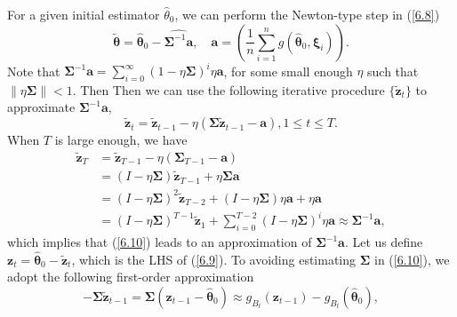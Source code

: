 \documentclass[12pt]{article}
\numberwithin{equation}{section}
\begin{document}
For a given initial estimator $\hat{\theta}_0$, we can perform the Newton-type step in (\ref{6.8})
\begin{equation}\label{6.9}
\widetilde{\boldsymbol{\theta}}=\widehat{\boldsymbol{\theta}}_{0}-\widehat{\boldsymbol{\Sigma}^{-1} \boldsymbol{a}}, \quad \boldsymbol{a}=\left(\frac{1}{n} \sum_{i=1}^{n} g\left(\widehat{\boldsymbol{\theta}}_{0}, \boldsymbol{\xi}_{i}\right)\right).
\end{equation}
Note that $\mathbf{\Sigma}^{-1} \boldsymbol{a}=\sum_{i=0}^{\infty}(1-\eta \boldsymbol{\Sigma})^{i} \eta \boldsymbol{a}$, for some small enough $\eta$ such that $\|\eta \boldsymbol{\Sigma}\|<1$. Then Then we can use the following iterative procedure $\{\widetilde{\boldsymbol{z}}_t\}$ to approximate $\boldsymbol{\Sigma}^{-1} \boldsymbol{a}$,
\begin{equation}\label{6.10}
\widetilde{\boldsymbol{z}}_{t}=\widetilde{\boldsymbol{z}}_{t-1}-\eta\left(\boldsymbol{\Sigma} \tilde{\boldsymbol{z}}_{t-1}-\boldsymbol{a}\right), 1 \leq t \leq T.
\end{equation}
When $T$ is large enough, we have 
\begin{align*}
\widetilde{\boldsymbol{z}}_{T} &=\widetilde{\boldsymbol{z}}_{T-1}-\eta\left(\boldsymbol{\Sigma}_{T-1}-\boldsymbol{a}\right)\\
&=(I-\eta \boldsymbol{\Sigma}) \widetilde{\boldsymbol{z}}_{T-1}+\eta \boldsymbol{\Sigma} \boldsymbol{a} \\ &=(I-\eta \boldsymbol{\Sigma})^{2} \widetilde{\boldsymbol{z}}_{T-2}+(I-\eta \boldsymbol{\Sigma}) \eta \boldsymbol{a}+\eta \boldsymbol{a} \\ &=(I-\eta \boldsymbol{\Sigma})^{T-1} \widetilde{\boldsymbol{z}}_{1}+\sum_{i=0}^{T-2}(I-\eta \boldsymbol{\Sigma})^{i} \eta \boldsymbol{a} \approx \boldsymbol{\Sigma}^{-1} \boldsymbol{a},
\end{align*}
which implies that (\ref{6.10}) leads to an approximation of $\boldsymbol{\Sigma}^{-1} \boldsymbol{a}$. Let us define $\boldsymbol{z}_{t}=\widehat{\boldsymbol{\theta}}_{0}-\widetilde{\boldsymbol{z}}_{t}$, which is the LHS of (\ref{6.9}). To avoiding estimating $\boldsymbol{\Sigma}$ in (\ref{6.10}), we adopt the following first-order approximation
\begin{equation}\label{6.11}
-\boldsymbol{\Sigma} \tilde{\boldsymbol{z}}_{t-1}=\boldsymbol{\Sigma}\left(\boldsymbol{z}_{t-1}-\widehat{\boldsymbol{\theta}}_{0}\right) \approx g_{B_{t}}\left(\boldsymbol{z}_{t-1}\right)-g_{B_{t}}\left(\widehat{\boldsymbol{\theta}}_{0}\right),
\end{equation}
\end{document}

